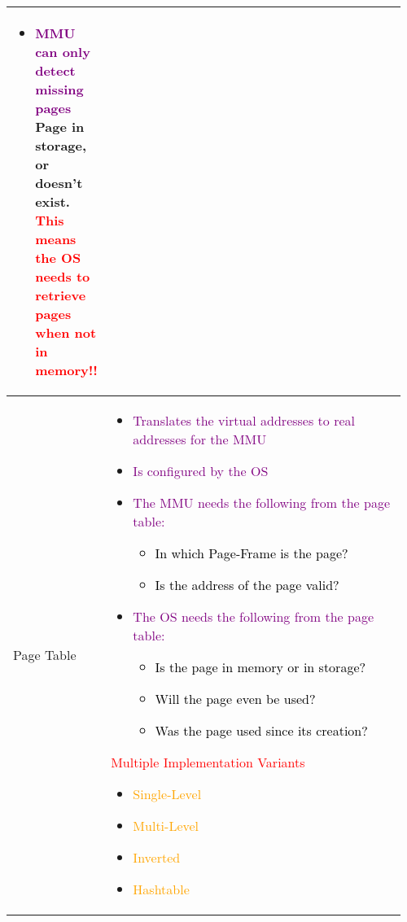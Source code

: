 \documentclass[main.tex,fontsize=8pt,paper=a4,paper=portrait,DIV=calc,]{scrartcl}
\begin{document}
\begin{table}[ht!]
\begin{tabular}{|m{0.2\linewidth}|m{0.755\linewidth}|}
\begin{itemize}
\item \textcolor{purple}{MMU can only detect missing pages}\newline
  Page in storage, or doesn't exist.\newline
  \textcolor{red}{This means the OS needs to retrieve pages when not in memory!!}
\vspace{-3mm}
\end{itemize} 
\\
\hline
Page Table & 
\vspace{2mm}
\begin{itemize}
\item \textcolor{purple}{Translates the virtual addresses to real addresses for the MMU}
\item \textcolor{purple}{Is configured by the OS}
\item \textcolor{purple}{The MMU needs the following from the page table:}\newline
  \begin{itemize}
  \item \textcolor{black}{In which Page-Frame is the page?}
  \item \textcolor{black}{Is the address of the page valid?}
  \end{itemize} 
\item \textcolor{purple}{The OS needs the following from the page table:}\newline
  \begin{itemize}
  \item \textcolor{black}{Is the page in memory or in storage?}
  \item \textcolor{black}{Will the page even be used?}
  \item \textcolor{black}{Was the page used since its creation?}
  \end{itemize} 
\end{itemize}
\textcolor{red}{Multiple Implementation Variants}
\begin{itemize}
\item \textcolor{orange}{Single-Level}
\item \textcolor{orange}{Multi-Level}
\item \textcolor{orange}{Inverted}
\item \textcolor{orange}{Hashtable}
\vspace{-3mm}
\end{itemize} 
\\
\hline
\end{tabular}
\end{table}
\end{document}
